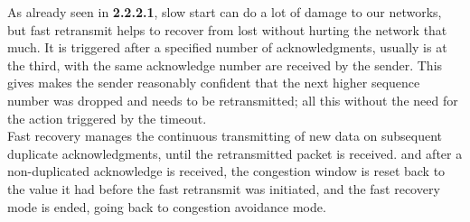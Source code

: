 As already seen in \textbf{2.2.2.1}, slow start can do a lot of damage to our networks, but fast retransmit helps to recover from lost without hurting the network that much. It is triggered after a specified number of acknowledgments, usually is at the third, with the same acknowledge number are received by the sender. This gives makes the sender reasonably confident that the next higher sequence number was dropped and needs to be retransmitted; all this without the need for the action triggered by the timeout.\\

Fast recovery manages the continuous transmitting of new data on subsequent duplicate acknowledgments, until the retransmitted packet is received. and after a non-duplicated acknowledge is received, the congestion window is reset back to the value it had before the fast retransmit was initiated, and the fast recovery mode is ended, going back to congestion avoidance mode.\\

